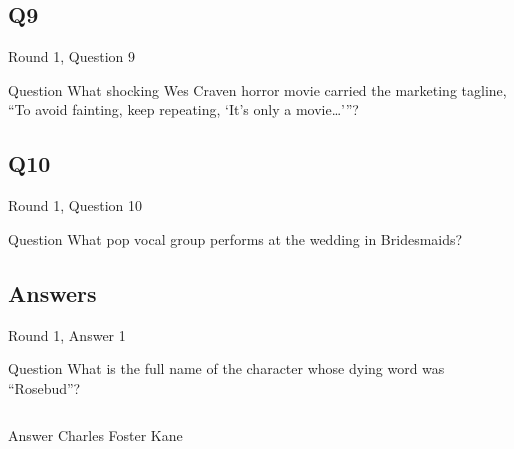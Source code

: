 \documentclass[11pt]{beamer}
\begin{document}
\subsection*{Q9}
\begin{frame}[t]{Round 1, Question 9}
\vspace{2em}
\begin{block}{Question}
What shocking Wes Craven horror movie carried the marketing tagline, ``To avoid fainting, keep repeating, `It's only a movie…'{}''?
\end{block}
\end{frame}
    

\subsection*{Q10}
\begin{frame}[t]{Round 1, Question 10}
\vspace{2em}
\begin{block}{Question}
What pop vocal group performs at the wedding in Bridesmaids?
\end{block}
\end{frame}
    
\subsection{Answers}

\begin{frame}[t]{Round 1, Answer 1}
\vspace{2em}
\begin{block}{Question}
What is the full name of the character whose dying word was ``Rosebud''?
\end{block}
\pause{}
\begin{columns}[T,totalwidth=\linewidth]
\begin{column}{0.35\linewidth}
\begin{block}{Answer}
Charles Foster Kane
\end{block}
\end{column}
\begin{column}{0.6\linewidth}
\begin{center}
\texttt{[image: \{Images/citizenkane]}.jpg}
\end{center}
\end{column}
\end{columns}
\end{frame}
    
\end{document}
